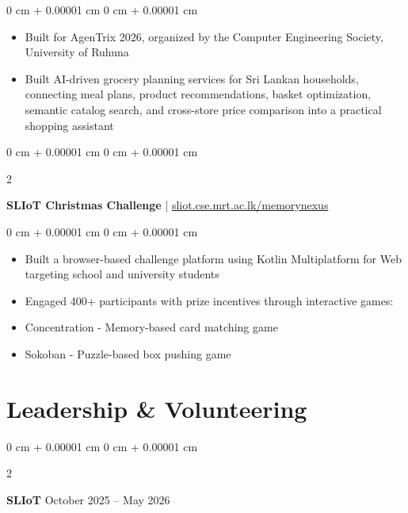 \documentclass[10pt, letterpaper]{article}
\newenvironment{highlights}{
    \begin{itemize}[
        topsep=0.10 cm,
        parsep=0.10 cm,
        partopsep=0pt,
        itemsep=0pt,
        leftmargin=0 cm + 10pt
    ]
}{
    \end{itemize}
} %
\newenvironment{onecolentry}{
    \begin{adjustwidth}{
        0 cm + 0.00001 cm
    }{
        0 cm + 0.00001 cm
    }
}{
    \end{adjustwidth}
} %
\newenvironment{twocolentry}[2][]{
    \onecolentry
    \def\secondColumn{#2}
    \setcolumnwidth{\fill, 4.5 cm}
    \begin{paracol}{2}
}{
    \switchcolumn \raggedleft \secondColumn
    \end{paracol}
    \endonecolentry
} %
\let\hrefWithoutArrow\href
\begin{document}
        \vspace{0.10 cm}
        \begin{onecolentry}
            \begin{highlights}
                \item Built for AgenTrix 2026, organized by the Computer Engineering Society, University of Ruhuna
                \item Built AI-driven grocery planning services for Sri Lankan households, connecting meal plans, product recommendations, basket optimization, semantic catalog search, and cross-store price comparison into a practical shopping assistant
            \end{highlights}
        \end{onecolentry}

        \vspace{0.30 cm}
        \begin{twocolentry}{
            2025
        }
            \textbf{SLIoT Christmas Challenge} | \hrefWithoutArrow{https://sliot.cse.mrt.ac.lk/memorynexus/}{sliot.cse.mrt.ac.lk/memorynexus}\end{twocolentry}

        \vspace{0.10 cm}
        \begin{onecolentry}
            \begin{highlights}
                \item Built a browser-based challenge platform using Kotlin Multiplatform for Web targeting school and university students
                \item Engaged 400+ participants with prize incentives through interactive games:
                \item Concentration - Memory-based card matching game
                \item Sokoban - Puzzle-based box pushing game
            \end{highlights}
        \end{onecolentry}







    \section{Leadership \& Volunteering}

        \begin{twocolentry}{
            October 2025 – May 2026
        }
            \textbf{SLIoT}\end{twocolentry}
\end{document}
